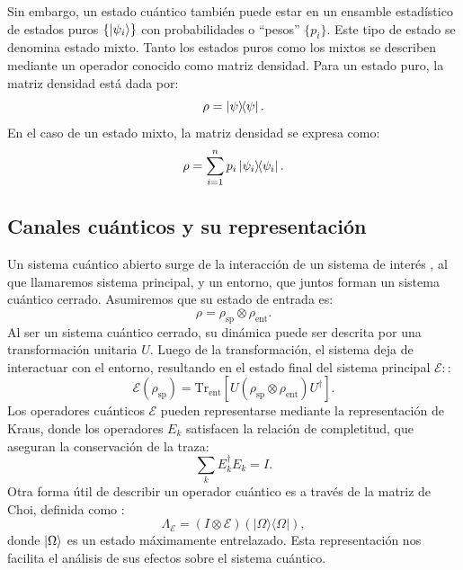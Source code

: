 \documentclass[11pt, spanish, letterpage]{article} %
\begin{document}
Sin embargo, un estado cuántico también puede estar en un ensamble estadístico
de estados puros $\{\ket{\psi_i}\}$ con probabilidades o ``pesos'' $\{p_i\}$. Este tipo
de estado se denomina estado mixto.
Tanto los estados puros como los mixtos se describen mediante un operador
conocido como matriz densidad. Para un estado puro, la matriz densidad está
dada por:
\begin{equation}
    \label{ec:1.5}
    \rho = \ketbra{\psi}.
\end{equation}
En el caso de un estado mixto, la matriz densidad se expresa como:
\begin{equation}
\label{dens_mixtos}
    \rho = \sum_{i=1}^{n} p_i \ketbra{\psi_i}.
\end{equation}




\subsection{Canales cuánticos y su representación}
Un sistema cuántico abierto surge de la interacción de un sistema de interés , al que llamaremos sistema principal, y un entorno, que juntos forman un sistema cuántico cerrado. Asumiremos que su estado de entrada es\cite{nielsen_chuang_2011}:
\begin{equation}
    \rho = \rho_{\text{sp}} \otimes \rho_{\text{ent}}.
\end{equation}
Al ser un sistema cuántico cerrado, su dinámica puede ser descrita por una transformación unitaria $U$. Luego de la transformación, el sistema deja de interactuar con el entorno, resultando en el estado final del sistema principal $\mathcal{E}:$:
\begin{equation}
    \mathcal{E}(\rho_{\text{sp}}) = \text{Tr}_{\text{ent}}[ U( \rho_{\text{sp}} \otimes \rho_{\text{ent}} ) U^\dagger ].
\end{equation}
Los operadores cuánticos $\mathcal{E}$ pueden representarse mediante la representación de Kraus, donde los operadores ${E_k}$ satisfacen la relación de completitud, que aseguran la conservación de la traza:
\begin{equation}
\sum_k E_k^\dagger E_k = I.
\end{equation} 
Otra forma útil de describir un operador cuántico es a través de la matriz de Choi, definida como \cite{Choi2024}:
\begin{equation}
\Lambda_{\mathcal{E}} = (I \otimes \mathcal{E})(|\Omega\rangle\langle\Omega|),
\end{equation}
donde $\ket{\Omega}$ es un estado máximamente entrelazado. Esta representación nos facilita el análisis de sus efectos sobre el sistema cuántico. 
\end{document}

